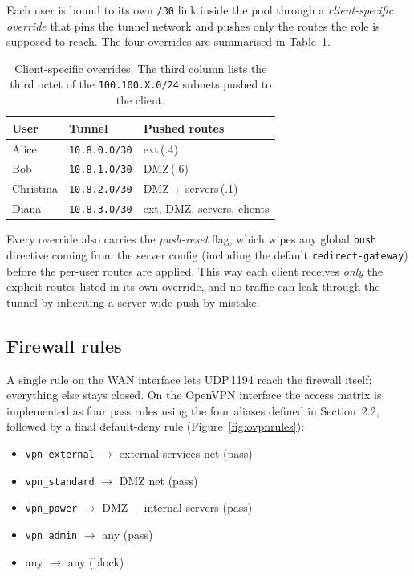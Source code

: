\documentclass[twocolumn]{NobArticle}
\begin{document}
Each user is bound to its own \texttt{/30} link inside the pool through a
\textit{client-specific override} that pins the tunnel network and pushes
only the routes the role is supposed to reach. The four overrides are
summarised in Table~\ref{tab:ccd}.

\begin{table}[H]
\centering
\begin{tabular}{lll}
\toprule
\textbf{User} & \textbf{Tunnel} & \textbf{Pushed routes} \\
\midrule
Alice     & \texttt{10.8.0.0/30} & ext\,(.4) \\
Bob       & \texttt{10.8.1.0/30} & DMZ\,(.6) \\
Christina & \texttt{10.8.2.0/30} & DMZ + servers\,(.1) \\
Diana     & \texttt{10.8.3.0/30} & ext, DMZ, servers, clients \\
\bottomrule
\end{tabular}
\caption{Client-specific overrides. The third column lists the third
octet of the \texttt{100.100.X.0/24} subnets pushed to the client.}
\label{tab:ccd}
\end{table}

Every override also carries the \textit{push-reset} flag, which wipes
any global \texttt{push} directive coming from the server config (including
the default \texttt{redirect-gateway}) before the per-user routes are
applied. This way each client receives \textit{only} the explicit routes
listed in its own override, and no traffic can leak through the tunnel
by inheriting a server-wide push by mistake.

\subsection{Firewall rules}

A single rule on the WAN interface lets UDP\,1194 reach the firewall
itself; everything else stays closed. On the OpenVPN interface the
access matrix is implemented as four pass rules using the four aliases
defined in Section~2.2, followed by a final default-deny rule
(Figure~\ref{fig:ovpnrules}):

\begin{itemize}
    \item \texttt{vpn\_external} $\to$ external services net (pass)
    \item \texttt{vpn\_standard} $\to$ DMZ net (pass)
    \item \texttt{vpn\_power} $\to$ DMZ + internal servers (pass)
    \item \texttt{vpn\_admin} $\to$ any (pass)
    \item any $\to$ any (block)
\end{itemize}
\end{document}
